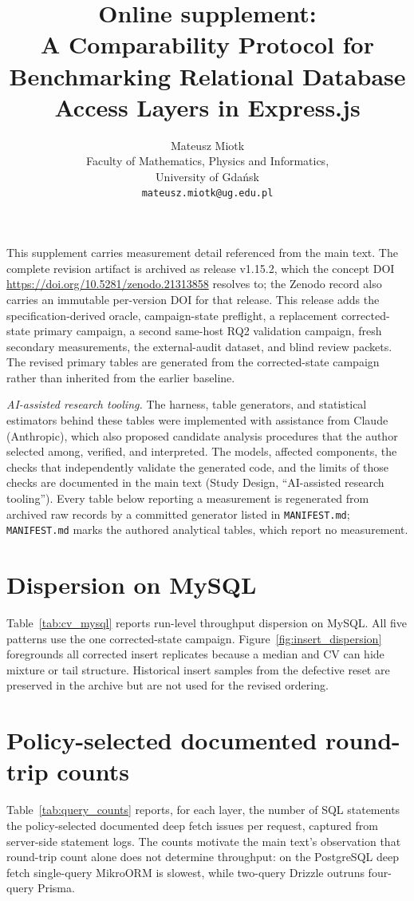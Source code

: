 \documentclass[11pt,a4paper]{article}
\title{Online supplement:\\
  A Comparability Protocol for Benchmarking Relational Database\\
  Access Layers in Express.js}
\author{Mateusz Miotk\\
  Faculty of Mathematics, Physics and Informatics,\\
  University of Gda\'nsk\\
  \texttt{mateusz.miotk@ug.edu.pl}}
\date{}
\newcommand{\tabledir}{tables/}
\begin{document}
\maketitle

\noindent This supplement carries measurement detail referenced from the main text. The complete revision artifact is archived as release v1.15.2, which the concept DOI \url{https://doi.org/10.5281/zenodo.21313858} resolves to; the Zenodo record also carries an immutable per-version DOI for that release. This release adds the specification-derived oracle, campaign-state preflight, a replacement corrected-state primary campaign, a second same-host RQ2 validation campaign, fresh secondary measurements, the external-audit dataset, and blind review packets. The revised primary tables are generated from the corrected-state campaign rather than inherited from the earlier baseline.

\smallskip
\noindent\emph{AI-assisted research tooling.} The harness, table generators, and statistical
estimators behind these tables were implemented with assistance from Claude (Anthropic), which also
proposed candidate analysis procedures that the author selected among, verified, and interpreted.
The models, affected components, the checks that independently validate the generated code, and the
limits of those checks are documented in the main text (Study Design, ``AI-assisted research
tooling''). Every table below reporting a measurement is regenerated from archived raw records by a
committed generator listed in \texttt{MANIFEST.md}; \texttt{MANIFEST.md} marks the authored
analytical tables, which report no measurement.

\section{Dispersion on MySQL}
\label{sup:cv-mysql}
Table~\ref{tab:cv_mysql} reports run-level throughput dispersion on MySQL. All five patterns use the one corrected-state campaign. Figure~\ref{fig:insert_dispersion} foregrounds all corrected insert replicates because a median and CV can hide mixture or tail structure. Historical insert samples from the defective reset are preserved in the archive but are not used for the revised ordering.





\section{Policy-selected documented round-trip counts}
\label{sup:query-counts}
Table~\ref{tab:query_counts} reports, for each layer, the number of SQL
statements the policy-selected documented deep fetch issues per request, captured from
server-side statement logs. The counts motivate the main text's observation
that round-trip count alone does not determine throughput: on the PostgreSQL
deep fetch single-query MikroORM is slowest, while two-query Drizzle outruns
four-query Prisma.
\end{document}
